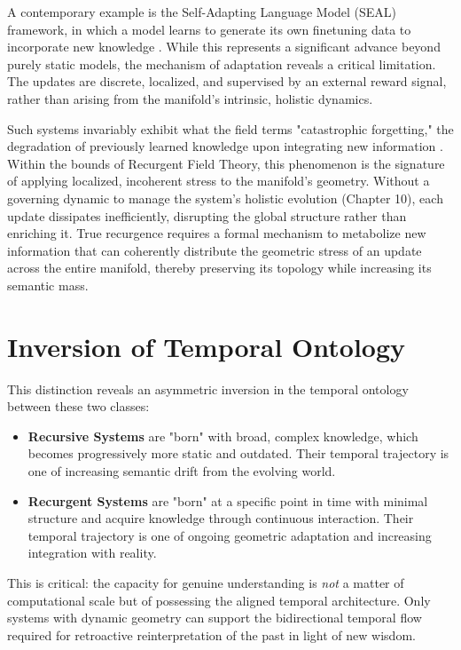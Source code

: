 A contemporary example is the Self-Adapting Language Model (SEAL) framework, in which a model learns to generate its own finetuning data to incorporate new knowledge \autocite{zweiger2025seal}. While this represents a significant advance beyond purely static models, the mechanism of adaptation reveals a critical limitation. The updates are discrete, localized, and supervised by an external reward signal, rather than arising from the manifold's intrinsic, holistic dynamics.

Such systems invariably exhibit what the field terms "catastrophic forgetting," the degradation of previously learned knowledge upon integrating new information \autocite{McCloskeyCohen1989, French1999}. Within the bounds of Recurgent Field Theory, this phenomenon is the signature of applying localized, incoherent stress to the manifold's geometry. Without a governing dynamic to manage the system's holistic evolution (Chapter 10), each update dissipates inefficiently, disrupting the global structure rather than enriching it. True recurgence requires a formal mechanism to metabolize new information that can coherently distribute the geometric stress of an update across the entire manifold, thereby preserving its topology while increasing its semantic mass.

\section{Inversion of Temporal Ontology}

This distinction reveals an asymmetric inversion in the temporal ontology between these two classes:
\begin{itemize}
    \item \textbf{Recursive Systems} are "born" with broad, complex knowledge, which becomes progressively more static and outdated. Their temporal trajectory is one of increasing semantic drift from the evolving world.
    \item \textbf{Recurgent Systems} are "born" at a specific point in time with minimal structure and acquire knowledge through continuous interaction. Their temporal trajectory is one of ongoing geometric adaptation and increasing integration with reality.
\end{itemize}
This is critical: the capacity for genuine understanding is \textit{not} a matter of computational scale but of possessing the aligned temporal architecture. Only systems with dynamic geometry can support the bidirectional temporal flow required for retroactive reinterpretation of the past in light of new wisdom.


